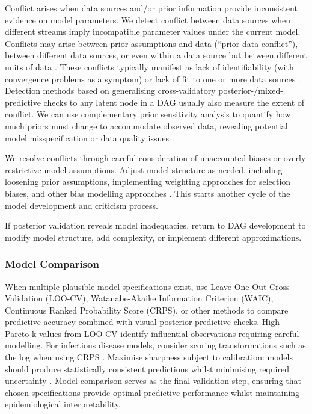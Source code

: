 \documentclass{article}
\begin{document}
Conflict arises when data sources and/or prior information provide inconsistent evidence on model parameters.
We detect conflict between data sources when different streams imply incompatible parameter values under the current model.
Conflicts may arise between prior assumptions and data (``prior-data conflict''), between different data sources, or even within a data source but between different units of data \citep{presanis2013conflict,yang2025detecting}.
These conflicts typically manifest as lack of identifiability (with convergence problems as a symptom) or lack of fit to one or more data sources \citep{presanis2013conflict,deangelis2018analysing}. Detection methods based on generalising cross-validatory posterior-/mixed-predictive checks to any latent node in a DAG \citep{presanis2013conflict,yang2025detecting} usually also measure the extent of conflict. We can use complementary  prior sensitivity analysis to quantify how much priors must change to accommodate observed data, revealing potential model misspecification or data quality issues \citep{Roos2015,Kallioinen2024,yang2025detecting}.

We resolve conflicts through careful consideration of unaccounted biases or overly restrictive model assumptions.
Adjust model structure as needed, including loosening prior assumptions, implementing weighting approaches for selection biases, and other bias modelling approaches \citep{deangelis2018analysing}.
This starts another cycle of the model development and criticism process.

If posterior validation reveals model inadequacies, return to DAG development to modify model structure, add complexity, or implement different approximations.

\subsubsection{Model Comparison}

When multiple plausible model specifications exist, use Leave-One-Out Cross-Validation (LOO-CV), Watanabe-Akaike Information Criterion (WAIC), Continuous Ranked Probability Score (CRPS), or other methods to compare predictive accuracy \citep{vehtari2017practical,yao2018using,gneiting2007strictly} combined with visual posterior predictive checks.
High Pareto-k values from LOO-CV identify influential observations requiring careful modelling.
For infectious disease models, consider scoring transformations such as the log when using CRPS \citep{bosse2023scoring}.
Maximise sharpness subject to calibration: models should produce statistically consistent predictions whilst minimising required uncertainty \citep{gneiting2007strictly}.
Model comparison serves as the final validation step, ensuring that chosen specifications provide optimal predictive performance whilst maintaining epidemiological interpretability.
\end{document}
